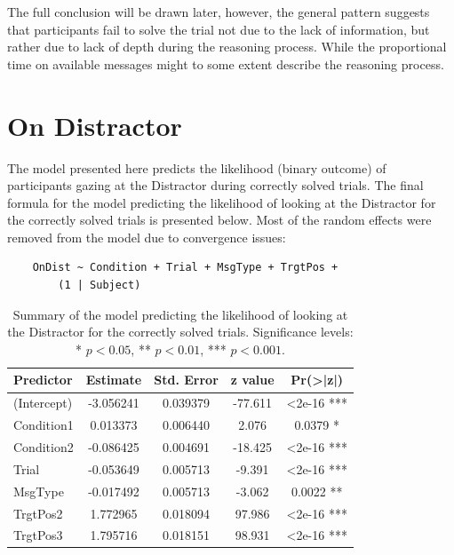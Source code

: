 The full conclusion will be drawn later, however, the general pattern suggests that participants fail to solve the trial not due to the lack of information, but rather due to lack of depth during the reasoning process. While the proportional time on available messages might to some extent describe the reasoning process.
















\section{On Distractor}
\label{sec:distractor_model}

The model presented here predicts the likelihood (binary outcome) of participants gazing at the Distractor during correctly solved trials. The final formula for the model predicting the likelihood of looking at the Distractor for the correctly solved trials is presented below. Most of the random effects were removed from the model due to convergence issues:
\begin{verbatim}
    OnDist ~ Condition + Trial + MsgType + TrgtPos +
        (1 | Subject)
\end{verbatim}

\begin{table}[h!]
\centering
\begin{tabular}{lcccc}
\hline
\textbf{Predictor} & \textbf{Estimate} & \textbf{Std. Error} & \textbf{z value} & \textbf{Pr(>|z|)} \\
\hline
(Intercept)          & -3.056241         & 0.039379            & -77.611          & <2e-16 ***        \\
Condition1           & 0.013373          & 0.006440            & 2.076            & 0.0379 *          \\
Condition2           & -0.086425         & 0.004691            & -18.425          & <2e-16 ***        \\
Trial                & -0.053649         & 0.005713            & -9.391           & <2e-16 ***        \\
MsgType             & -0.017492         & 0.005713            & -3.062           & 0.0022 **         \\
TrgtPos2             & 1.772965          & 0.018094            & 97.986           & <2e-16 ***        \\
TrgtPos3             & 1.795716          & 0.018151            & 98.931           & <2e-16 ***        \\
\hline
\end{tabular}
\caption{Summary of the model predicting the likelihood of looking at the Distractor for the correctly solved trials. Significance levels: * $p < 0.05$, ** $p < 0.01$, *** $p < 0.001$.}
\label{tab:model_coefficients_distractor}
\end{table}

